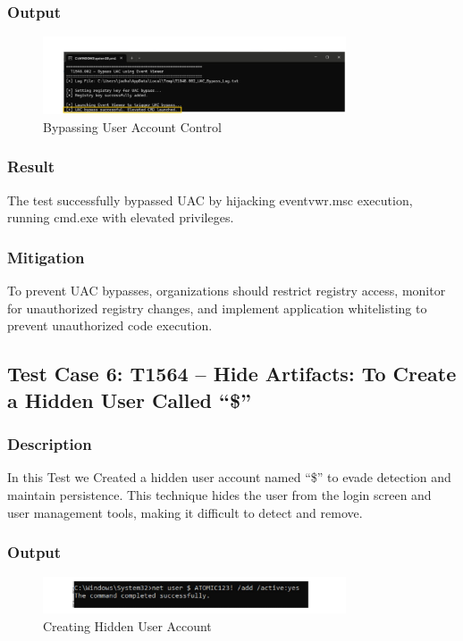 \documentclass[11pt]{article}
\begin{document}
\subsubsection{Output}
\begin{figure}[H]
    \centering
    \includegraphics[width=0.8\textwidth]{./images/7.jpeg}
    \caption{Bypassing User Account Control}
\end{figure}
\subsubsection{Result}
The test successfully bypassed UAC by hijacking eventvwr.msc execution, running cmd.exe with elevated privileges.
\subsubsection{Mitigation}
To prevent UAC bypasses, organizations should restrict registry access, monitor for unauthorized registry changes, and implement application whitelisting to prevent unauthorized code execution.    
\subsection{Test Case 6: T1564 -- Hide Artifacts: To Create a Hidden User Called ``\$''}
\subsubsection{Description}
In this Test we Created a hidden user account named ``\$'' to evade detection and maintain persistence. This technique hides the user from the login screen and user management tools, making it difficult to detect and remove.
\subsubsection{Output}
\begin{figure}[H]
    \centering
    \includegraphics[width=0.8\textwidth]{./images/8.jpeg}
    \caption{Creating Hidden User Account}
\end{figure}
\end{document}
